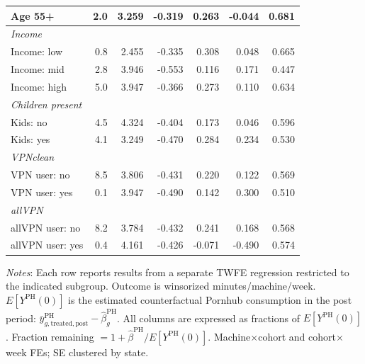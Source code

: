 \begin{landscape}
\begin{table}[htbp]
\begin{tabular}{lrr rrrr}
Age 55+ & 2.0 & 3.259 & -0.319 & 0.263 & -0.044 & 0.681 \\
\midrule
\multicolumn{7}{l}{\textit{Income}} \\
Income: low & 0.8 & 2.455 & -0.335 & 0.308 & 0.048 & 0.665 \\
Income: mid & 2.8 & 3.946 & -0.553 & 0.116 & 0.171 & 0.447 \\
Income: high & 5.0 & 3.947 & -0.366 & 0.273 & 0.110 & 0.634 \\
\midrule
\multicolumn{7}{l}{\textit{Children present}} \\
Kids: no & 4.5 & 4.324 & -0.404 & 0.173 & 0.046 & 0.596 \\
Kids: yes & 4.1 & 3.249 & -0.470 & 0.284 & 0.234 & 0.530 \\
\midrule
\multicolumn{7}{l}{\textit{VPNclean}} \\
VPN user: no & 8.5 & 3.806 & -0.431 & 0.220 & 0.122 & 0.569 \\
VPN user: yes & 0.1 & 3.947 & -0.490 & 0.142 & 0.300 & 0.510 \\
\midrule
\multicolumn{7}{l}{\textit{allVPN}} \\
allVPN user: no & 8.2 & 3.784 & -0.432 & 0.241 & 0.168 & 0.568 \\
allVPN user: yes & 0.4 & 4.161 & -0.426 & -0.071 & -0.490 & 0.574 \\
\bottomrule
\end{tabular}
\vspace{4pt}
\begin{minipage}{\linewidth}\footnotesize
\textit{Notes}: Each row reports results from a separate TWFE regression restricted to the indicated subgroup. Outcome is winsorized minutes/machine/week. $E[Y^{\text{PH}}(0)]$ is the estimated counterfactual Pornhub consumption in the post period: $\bar{y}^{\text{PH}}_{g,\text{treated},\text{post}} - \hat{\beta}^{\text{PH}}_g$. All columns are expressed as fractions of $E[Y^{\text{PH}}(0)]$. Fraction remaining $= 1 + \hat{\beta}^{\text{PH}}/E[Y^{\text{PH}}(0)]$. Machine$\times$cohort and cohort$\times$week FEs; SE clustered by state.
\end{minipage}
\end{table}
\end{landscape}
